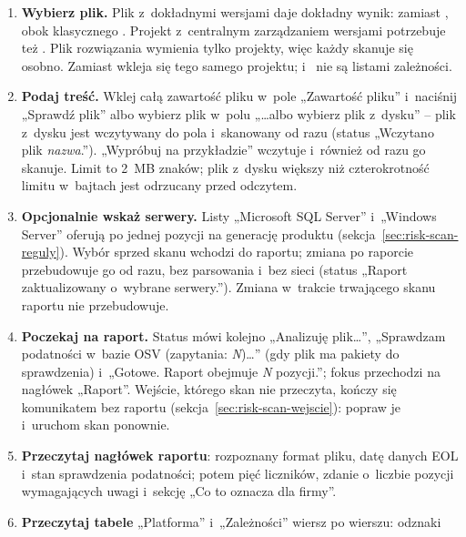 \begin{enumerate}
  \item \textbf{Wybierz plik.} Plik z~dokładnymi wersjami daje dokładny wynik:
         zamiast , 
        obok klasycznego . Projekt z~centralnym zarządzaniem wersjami
        potrzebuje też . Plik rozwiązania 
        wymienia tylko projekty, więc każdy  skanuje się osobno. Zamiast
         wkleja się  tego samego projektu;
         i~ nie są listami zależności.
  \item \textbf{Podaj treść.} Wklej całą zawartość pliku w~pole „Zawartość pliku”
        i~naciśnij „Sprawdź plik” albo wybierz plik w~polu „…albo wybierz plik z~dysku” --
        plik z~dysku jest wczytywany do pola i~skanowany od razu (status „Wczytano plik
        \emph{nazwa}.”). „Wypróbuj na przykładzie” wczytuje 
        i~również od razu go skanuje. Limit to 2~MB znaków; plik z~dysku większy niż
        czterokrotność limitu w~bajtach jest odrzucany przed odczytem.
  \item \textbf{Opcjonalnie wskaż serwery.} Listy „Microsoft SQL Server” i~„Windows Server”
        oferują po jednej pozycji na generację produktu
        (sekcja~\ref{sec:risk-scan-reguly}). Wybór sprzed skanu wchodzi do raportu; zmiana po
        raporcie przebudowuje go od razu, bez parsowania i~bez sieci (status „Raport
        zaktualizowany o~wybrane serwery.”). Zmiana w~trakcie trwającego skanu raportu nie
        przebudowuje.
  \item \textbf{Poczekaj na raport.} Status mówi kolejno „Analizuję plik…”, „Sprawdzam
        podatności w~bazie OSV (zapytania: \emph{N})…” (gdy plik ma pakiety do sprawdzenia)
        i~„Gotowe. Raport obejmuje \emph{N} pozycji.”; fokus przechodzi na nagłówek
        „Raport”. Wejście, którego skan nie przeczyta, kończy się komunikatem bez raportu
        (sekcja~\ref{sec:risk-scan-wejscie}): popraw je i~uruchom skan ponownie.
  \item \textbf{Przeczytaj nagłówek raportu}: rozpoznany format pliku, datę danych EOL
        i~stan sprawdzenia podatności; potem pięć liczników, zdanie o~liczbie pozycji
        wymagających uwagi i~sekcję „Co to oznacza dla firmy”.
  \item \textbf{Przeczytaj tabele} „Platforma” i~„Zależności” wiersz po wierszu: odznaki

\end{enumerate}
